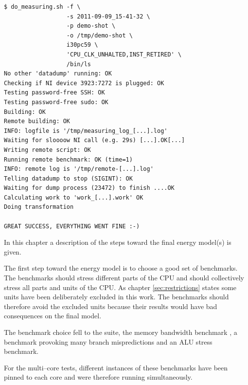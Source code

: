 \begin{lstlisting}[style=Shell]
$ do_measuring.sh -f \
                  -s 2011-09-09_15-41-32 \
                  -p demo-shot \
                  -o /tmp/demo-shot \
                  i30pc59 \
                  'CPU_CLK_UNHALTED,INST_RETIRED' \
                  /bin/ls
No other 'datadump' running: OK
Checking if NI device 3923:7272 is plugged: OK
Testing password-free SSH: OK
Testing password-free sudo: OK
Building: OK
Remote building: OK
INFO: logfile is '/tmp/measuring_log_[...].log'
Waiting for sloooow NI call (e.g. 29s) [...].OK[...]
Writing remote script: OK
Running remote benchmark: OK (time=1)
INFO: remote log is '/tmp/remote-[...].log'
Telling datadump to stop (SIGINT): OK
Waiting for dump process (23472) to finish ....OK
Calculating work to 'work_[...].work' OK
Doing transformation

GREAT SUCCESS, EVERYTHING WENT FINE :-)
\end{lstlisting}




\label{sec:towards-the-model}

In this chapter a description of the steps toward the final energy model(s) is
given.


\label{sec:benchmarks}

The first step toward the energy model is to choose a good set of benchmarks.
The benchmarks should stress different parts of the CPU and should collectively
stress all parts and units of the CPU. As chapter \ref{sec:restrictions} states
some units have been deliberately excluded in this work. The benchmarks should
therefore avoid the excluded units because their results would have bad
consequences on the final model.

The benchmark choice fell to the \JWTLspec{} suite, the memory bandwidth
benchmark \JWTLstream{}, a benchmark provoking many branch mispredictions
and an ALU stress benchmark.

For the multi--core tests, different instances of these benchmarks have been
pinned to each core and were therefore running simultaneously.


\label{sec:finding-useful-subset}

